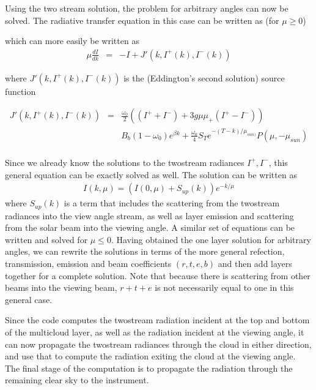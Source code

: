 \documentclass[12pt]{article}
\begin{document}
{{{{Using the two stream solution, the problem for arbitrary angles can now be 
solved. The radiative transfer equation in this case can be written as 
(for $\mu \geq 0$)

which can more easily be written as 
\[
\begin{array}{ccc}
\mu \frac{dI}{dk} & = & -I + J\prime(k,I^{+}(k),I^{-}(k))
\end{array}
\]

where $J\prime(k,I^{+}(k),I^{-}(k))$ is the (Eddington's second 
solution) source function

\[
\begin{array}{ccc}
J\prime(k,I^{+}(k),I^{-}(k)) & = & \frac{\omega_{0}}{2} \left(
(I^{+} + I^{-}) + 3g\mu \mu_{+}(I^{+} - I^{-}) \right) \\
                             & & B_{b}(1-\omega_{0})e^{\beta k} + 
\frac{\omega_{0}}{4}S_{T}e^{-(T-k)/\mu_{sun)}}P(\mu,-\mu_{sun}) \\
\end{array}
\]

Since we already know the solutions to the twostream radiances $I^{+},I^{-}$,
this general equation can be exactly solved as well. The solution can be 
written as
\[
\begin{array}{ccc}
I(k,\mu) = \left( I(0,\mu) + S_{up}(k) \right) e^{-k/\mu}
\end{array}
\]
where $S_{up}(k)$ is a term that includes the scattering from the twostream
radiances into the view angle stream, as well as layer emission and 
scattering from the solar beam into the viewing angle. A similar set of 
equations can be written and solved for $\mu \leq 0$. Having obtained the one
layer solution for arbitrary angles, we can rewrite the solutions in terms 
of the more general refection, transmission, emission and beam coefficients
$(r,t,e,b)$ and then add layers together for a complete solution. Note that 
because there is scattering from other beams into the viewing beam, $r+t+e$ 
is not necessarily equal to one in this general case. 

Since the code computes the twostream radiation incident at the top and
bottom of the multicloud layer, as well as the radiation incident at the
viewing angle, it can now propagate the twostream radiances through the cloud 
in either direction, and use that to compute the radiation exiting the cloud 
at the viewing angle. The final stage of the computation is to propagate the 
radiation through the remaining clear sky to the instrument.

}}}}
\end{document}
